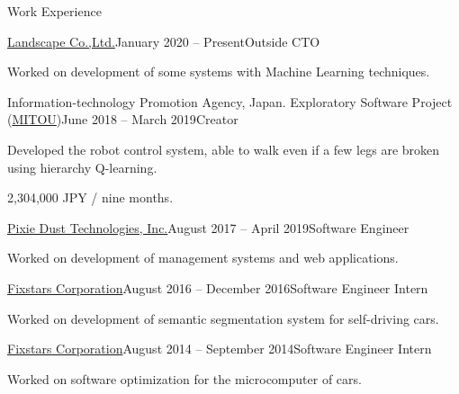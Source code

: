 \documentclass{resume} %
\begin{document}
\begin{rSection}{Work Experience}

    \begin{rSubsection}{\href{https://www.landscape.co.jp/}{Landscape Co.,Ltd.}}{January 2020 -- Present}{Outside CTO}{}
    \item Worked on development of some systems with Machine Learning techniques.
    \end{rSubsection}

    \begin{rSubsection}{Information-technology Promotion Agency, Japan. Exploratory Software Project (\href{https://www.mitou.org/}{MITOU})}{June 2018 -- March 2019}{Creator}{}
    \item Developed the robot control system, able to walk even if a few legs are broken using hierarchy Q-learning.
    \item 2,304,000 JPY / nine months.
    \end{rSubsection}

    \begin{rSubsection}{\href{http://pixiedusttech.com/}{Pixie Dust Technologies, Inc.}}{August 2017 -- April 2019}{Software Engineer}{}
    \item Worked on development of management systems and web applications.
    \end{rSubsection}

    \begin{rSubsection}{\href{https://www.fixstars.com/en/}{Fixstars Corporation}}{August 2016 -- December 2016}{Software Engineer Intern}{}
    \item Worked on development of semantic segmentation system for self-driving cars.
    \end{rSubsection}

    \begin{rSubsection}{\href{https://www.fixstars.com/en/}{Fixstars Corporation}}{August 2014 -- September 2014}{Software Engineer Intern}{}
    \item Worked on software optimization for the microcomputer of cars.
    \end{rSubsection}

\end{rSection}

\end{document}
